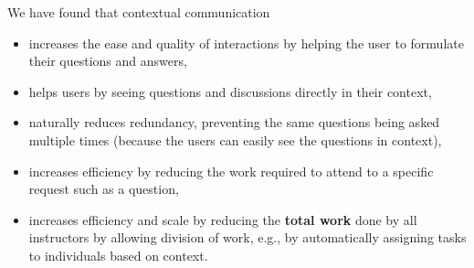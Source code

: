 \begin{gram}
We have found that contextual communication
\begin{itemize}
\item increases the ease and quality of interactions by helping the user to formulate their questions and answers,
\item helps users by seeing questions and discussions directly in their context,
\item naturally reduces redundancy, preventing the same questions
  being asked multiple times (because the users can easily see the
  questions in context),
\item increases efficiency by reducing the work required to attend to
  a specific request such as a question,
\item increases efficiency and scale by reducing the \textbf{total
  work} done by all instructors by allowing division of work, e.g., by
  automatically assigning tasks to individuals based on context.
\end{itemize}
\end{gram}
